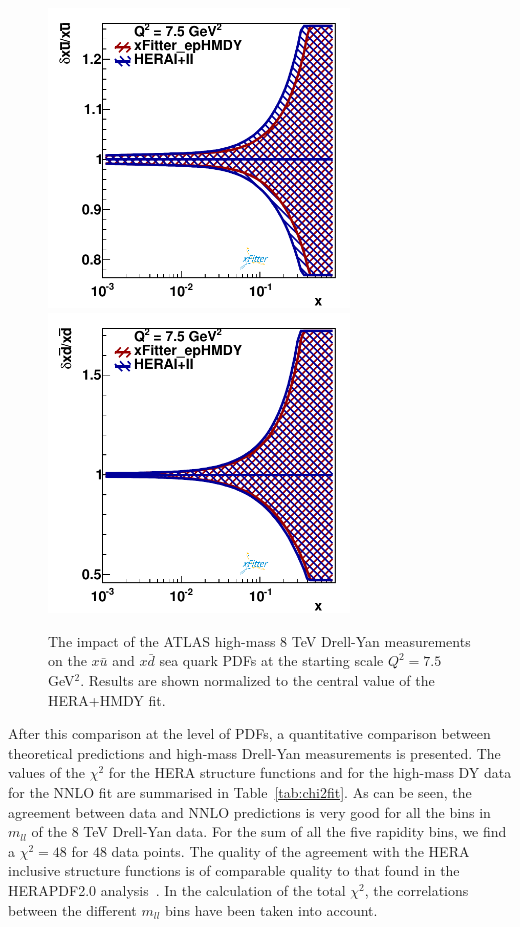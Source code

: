 \begin{figure}[t]
\centering
\includegraphics[width=8cm]{figs/q2_7_5_pdf_ubar_ratio.pdf}
\includegraphics[width=8cm]{figs/q2_7_5_pdf_dbar_ratio.pdf} 
\caption{The impact of the ATLAS high-mass 8 TeV Drell-Yan measurements
  on the $x\bar{u}$ and $x\bar{d}$ sea quark PDFs at the starting scale $Q^2=7.5$ GeV$^2$.
  Results are shown normalized to the central value of the HERA+HMDY
  fit.  }
\label{fig:QCDfit}
\end{figure}

After this comparison at the level of PDFs, a quantitative comparison
between theoretical predictions and high-mass Drell-Yan measurements is presented.
%
The values of the $\chi^2$ for the HERA structure functions and for
the high-mass DY data for the NNLO fit are summarised in
Table~\ref{tab:chi2fit}.
%
As can be seen, the agreement between data and NNLO predictions is
very good for all the bins in $m_{ll}$ of the $8$ TeV Drell-Yan data.
%
For the sum of all the five rapidity bins, we find a $\chi^2=48$ for
$48$ data points.
%
The quality of the agreement with the HERA inclusive structure
functions is of comparable quality to that found in the HERAPDF2.0 analysis~\cite{}.
%
In the calculation of the total $\chi^2$, the correlations between the
different $m_{ll}$ bins have been taken into account.

